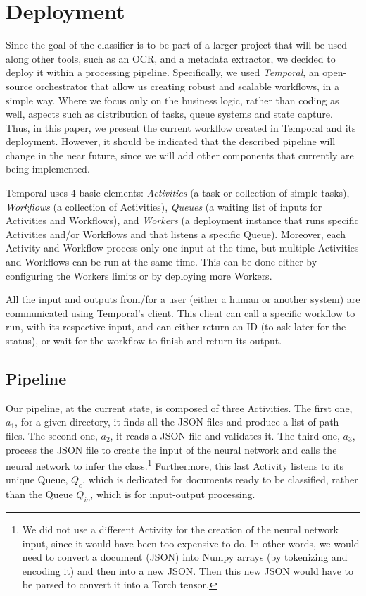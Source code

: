 \documentclass[11pt]{article}
\begin{document}
    

\section{Deployment}

    Since the goal of the classifier is to be part of a larger project that will be used along other tools, such as an OCR, and a metadata extractor, we decided to deploy it within a processing pipeline. Specifically, we used \textit{Temporal}, an open-source orchestrator that allow us creating robust and scalable workflows, in a simple way. Where we focus only on the business logic, rather than coding as well, aspects such as distribution of tasks, queue systems and state capture. Thus, in this paper, we present the current workflow created in Temporal and its deployment. However, it should be indicated that the described pipeline will change in the near future, since we will add other components that currently are being implemented.

    Temporal uses 4 basic elements: \textit{Activities} (a task or collection of simple tasks), \textit{Workflows} (a collection of Activities), \textit{Queues} (a waiting list of inputs for Activities and Workflows), and \textit{Workers} (a deployment instance that runs specific Activities and/or Workflows and that listens a specific Queue). Moreover, each Activity and Workflow process only one input at the time, but multiple Activities and Workflows can be run at the same time. This can be done either by configuring the Workers limits or by deploying more Workers.

    All the input and outputs from/for a user (either a human or another system) are communicated using Temporal's client. This client can call a specific workflow to run, with its respective input, and can either return an ID (to ask later for the status), or wait for the workflow to finish and return its output.

    \subsection{Pipeline}
    \label{sec: Pipeline}

        Our pipeline, at the current state, is composed of three Activities. The first one, $a_1$, for a given directory, it finds all the JSON files and produce a list of path files. The second one, $a_2$, it reads a JSON file and validates it. The third one, $a_3$, process the JSON file to create the input of the neural network and calls the neural network to infer the class.\footnote{We did not use a different Activity for the creation of the neural network input, since it would have been too expensive to do. In other words, we would need to convert a document (JSON) into Numpy arrays (by tokenizing and encoding it) and then into a new JSON. Then this new JSON would have to be parsed to convert it into a Torch tensor.} Furthermore, this last Activity listens to its unique Queue, $Q_c$, which is dedicated for documents ready to be classified, rather than the Queue $Q_{io}$, which is for input-output processing.
        
\end{document}
